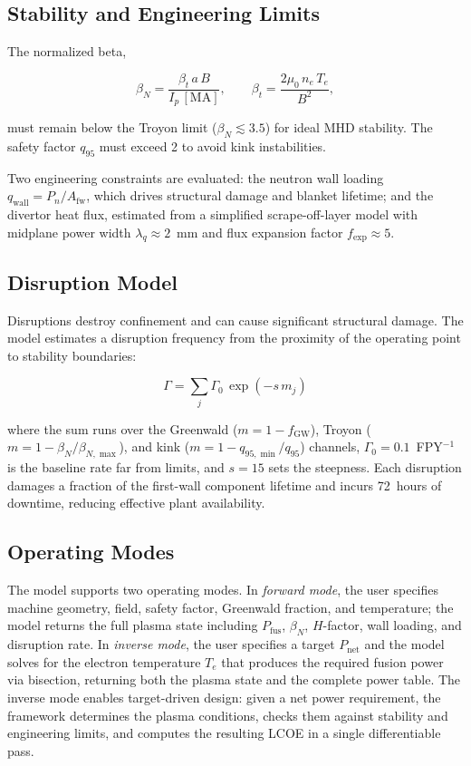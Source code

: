 \documentclass{article}
\begin{document}
\subsection{Stability and Engineering Limits}

The normalized beta,

\begin{equation}
\label{eq:beta-n}
\beta_N = \frac{\beta_t\,a\,B}{I_p\,[\text{MA}]},
\qquad
\beta_t = \frac{2\mu_0\,n_e\,T_e}{B^2},
\end{equation}

\noindent must remain below the Troyon limit ($\beta_N \lesssim 3.5$)
for ideal MHD stability. The safety factor $q_{95}$ must exceed
2 to avoid kink instabilities.

Two engineering constraints are evaluated: the neutron wall loading
$q_{\text{wall}} = P_n / A_{\text{fw}}$, which drives structural
damage and blanket lifetime; and the divertor heat flux, estimated
from a simplified scrape-off-layer model with midplane power width
$\lambda_q \approx 2$~mm and flux expansion factor $f_{\text{exp}}
\approx 5$.

\subsection{Disruption Model}

Disruptions destroy confinement and can cause significant structural
damage. The model estimates a disruption frequency from the proximity
of the operating point to stability boundaries:

\begin{equation}
\label{eq:disruption-rate}
\Gamma = \sum_{j} \Gamma_0\,\exp\!\left(-s\,m_j\right)
\end{equation}

\noindent where the sum runs over the Greenwald ($m = 1 - f_{\text{GW}}$),
Troyon ($m = 1 - \beta_N/\beta_{N,\max}$), and kink
($m = 1 - q_{95,\min}/q_{95}$) channels, $\Gamma_0 = 0.1$~FPY$^{-1}$
is the baseline rate far from limits, and $s = 15$ sets the
steepness. Each disruption damages a fraction of the first-wall
component lifetime and incurs 72~hours of downtime, reducing
effective plant availability.

\subsection{Operating Modes}

The model supports two operating modes. In \emph{forward mode}, the
user specifies machine geometry, field, safety factor, Greenwald
fraction, and temperature; the model returns the full plasma state
including $P_{\text{fus}}$, $\beta_N$, $H$-factor, wall loading,
and disruption rate. In \emph{inverse mode}, the user specifies a
target $P_{\text{net}}$ and the model solves for the electron
temperature $T_e$ that produces the required fusion power via
bisection, returning both the plasma state and the complete power
table. The inverse mode enables target-driven design: given a net
power requirement, the framework determines the plasma conditions,
checks them against stability and engineering limits, and computes
the resulting LCOE in a single differentiable pass.
\end{document}
